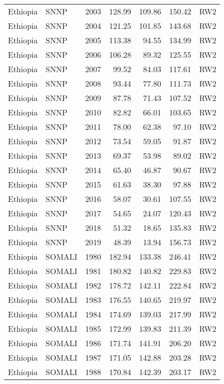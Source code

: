 \begin{longtable}{lllrrrl}
  Ethiopia & SNNP & 2003 & 128.99 & 109.86 & 150.42 & RW2 \\ 
  Ethiopia & SNNP & 2004 & 121.25 & 101.85 & 143.68 & RW2 \\ 
  Ethiopia & SNNP & 2005 & 113.38 & 94.55 & 134.99 & RW2 \\ 
  Ethiopia & SNNP & 2006 & 106.28 & 89.32 & 125.55 & RW2 \\ 
  Ethiopia & SNNP & 2007 & 99.52 & 84.03 & 117.61 & RW2 \\ 
  Ethiopia & SNNP & 2008 & 93.44 & 77.80 & 111.73 & RW2 \\ 
  Ethiopia & SNNP & 2009 & 87.78 & 71.43 & 107.52 & RW2 \\ 
  Ethiopia & SNNP & 2010 & 82.82 & 66.01 & 103.65 & RW2 \\ 
  Ethiopia & SNNP & 2011 & 78.00 & 62.38 & 97.10 & RW2 \\ 
  Ethiopia & SNNP & 2012 & 73.54 & 59.05 & 91.87 & RW2 \\ 
  Ethiopia & SNNP & 2013 & 69.37 & 53.98 & 89.02 & RW2 \\ 
  Ethiopia & SNNP & 2014 & 65.40 & 46.87 & 90.67 & RW2 \\ 
  Ethiopia & SNNP & 2015 & 61.63 & 38.30 & 97.88 & RW2 \\ 
  Ethiopia & SNNP & 2016 & 58.07 & 30.61 & 107.55 & RW2 \\ 
  Ethiopia & SNNP & 2017 & 54.65 & 24.07 & 120.43 & RW2 \\ 
  Ethiopia & SNNP & 2018 & 51.32 & 18.65 & 135.83 & RW2 \\ 
  Ethiopia & SNNP & 2019 & 48.39 & 13.94 & 156.73 & RW2 \\ 
  Ethiopia & SOMALI & 1980 & 182.94 & 133.38 & 246.41 & RW2 \\ 
  Ethiopia & SOMALI & 1981 & 180.82 & 140.82 & 229.83 & RW2 \\ 
  Ethiopia & SOMALI & 1982 & 178.72 & 142.11 & 222.84 & RW2 \\ 
  Ethiopia & SOMALI & 1983 & 176.55 & 140.65 & 219.97 & RW2 \\ 
  Ethiopia & SOMALI & 1984 & 174.69 & 139.03 & 217.99 & RW2 \\ 
  Ethiopia & SOMALI & 1985 & 172.99 & 139.83 & 211.39 & RW2 \\ 
  Ethiopia & SOMALI & 1986 & 171.74 & 141.91 & 206.20 & RW2 \\ 
  Ethiopia & SOMALI & 1987 & 171.05 & 142.88 & 203.28 & RW2 \\ 
  Ethiopia & SOMALI & 1988 & 170.84 & 142.39 & 203.17 & RW2 \\ 

\end{longtable}
